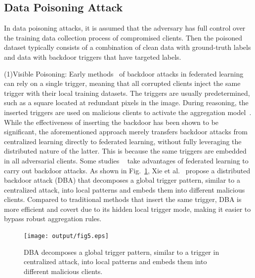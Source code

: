\documentclass[a4paper,fleqn]{cas-dc}
\begin{document}
\subsection{Data Poisoning Attack}
In data poisoning attacks, it is assumed that the
adversary has full control over the training data collection
process of compromised clients. Then the poisoned dataset
typically consists of a combination of clean data with
ground-truth labels and data with backdoor triggers that
have targeted labels.

(1)Visible Poisoning: Early methods~\cite{bagdasaryan2020backdoor,gong2022backdoor} of backdoor
attacks in federated learning can rely on a single trigger,
meaning that all corrupted clients inject the same trigger
with their local training datasets. The triggers are usually predetermined, such as a
square located at redundant pixels in the image. During
reasoning, the inserted triggers are used on malicious
clients to activate the aggregation model~\cite{bagdasaryan2020backdoor,gong2022backdoor}. While
the effectiveness of inserting the backdoor has been shown
to be significant, the aforementioned approach merely
transfers backdoor attacks from centralized learning
directly to federated learning, without fully leveraging the
distributed nature of the latter. This is because the same
triggers are embedded in all adversarial clients. Some
studies ~\cite{xie2019dba} take advantages of federated learning to carry out
backdoor attacks. As shown in Fig.~\ref{fig5}, Xie et al.~\cite{xie2019dba} propose
a distributed backdoor attack (DBA) that decomposes a
global trigger pattern, similar to a centralized attack, into
local patterns and embeds them into different malicious
clients. Compared to traditional methods that insert the
same trigger, DBA is more eﬀicient and covert due to
its hidden local trigger mode, making it easier to bypass
robust aggregation rules.

\begin{figure}[h]
	\centering
	\texttt{[image: output/fig5.eps]}
	\caption{DBA decomposes a global trigger pattern, similar to a
		trigger in centralized attack, into local patterns and embeds them
		into different malicious clients.}
	\label{fig5}
\end{figure}
\end{document}
